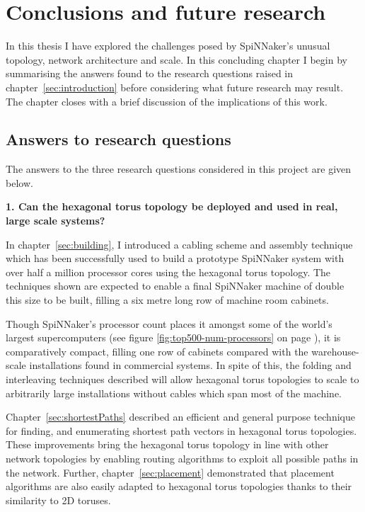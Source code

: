 \chapter{Conclusions and future research}
	
	In this thesis I have explored the challenges posed by SpiNNaker's unusual
	topology, network architecture and scale. In this concluding chapter I begin
	by summarising the answers found to the research questions raised in
	chapter~\ref{sec:introduction} before considering what future research may
	result. The chapter closes with a brief discussion of the implications of
	this work.
	
	\section{Answers to research questions}
		
		The answers to the three research questions considered in this project are
		given below.
		
		\textbf{1. Can the hexagonal torus topology be deployed and used in real,
		large scale systems?}
		
		In chapter~\ref{sec:building}, I introduced a cabling scheme and assembly
		technique which has been successfully used to build a prototype SpiNNaker
		system with over half a million processor cores using the hexagonal torus
		topology. The techniques shown are expected to enable a final SpiNNaker
		machine of double this size to be built, filling a six metre long row of
		machine room cabinets.
		
		Though SpiNNaker's processor count places it amongst some of the world's
		largest supercomputers (see figure \ref{fig:top500-num-processors} on page
		\pageref{fig:top500-num-processors}), it is comparatively compact, filling
		one row of cabinets compared with the warehouse-scale installations found
		in commercial systems. In spite of this, the folding and interleaving
		techniques described will allow hexagonal torus topologies to scale to
		arbitrarily large installations without cables which span most of the
		machine.
		
		Chapter~\ref{sec:shortestPaths} described an efficient and general purpose
		technique for finding, and enumerating shortest path vectors in hexagonal
		torus topologies. These improvements bring the hexagonal torus topology in
		line with other network topologies by enabling routing algorithms to
		exploit all possible paths in the network. Further,
		chapter~\ref{sec:placement} demonstrated that placement algorithms are also
		easily adapted to hexagonal torus topologies thanks to their similarity to
		2D toruses.
		

